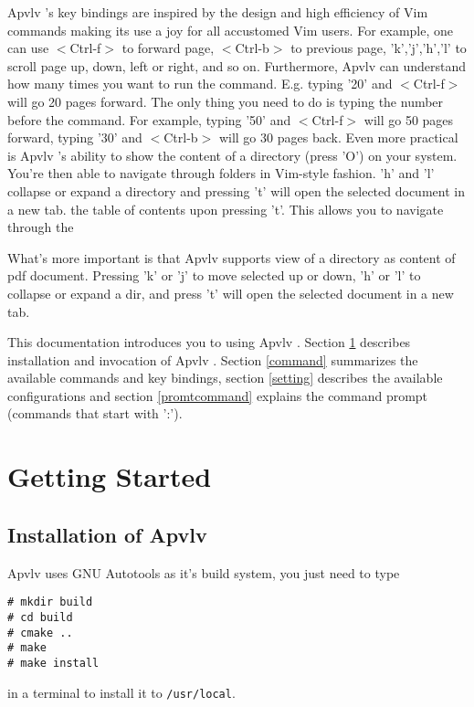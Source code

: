 \documentclass[a4paper,12pt]{article}
\newcommand{\apvlv}{\textsf{Apvlv{ }}}
\begin{document}
\apvlv's key bindings are inspired by the design and high efficiency of Vim commands making its use a joy for all accustomed Vim users. For example, one can use $<$Ctrl-f$>$ to forward page, $<$Ctrl-b$>$ to previous page, 'k','j','h','l' to scroll page up, down, left or right, and so on. 
Furthermore, \apvlv can understand how many times you want to run the command. E.g. typing '20' and  $<$Ctrl-f$>$ will go 20 pages forward.
The only thing you need to do is typing the number before the command. For example, typing '50' and $<$Ctrl-f$>$ will go 50 pages forward, typing '30' and $<$Ctrl-b$>$ will go 30 pages back.
Even more practical is \apvlv's ability to show the content of a directory (press 'O') on your system. You're then able to navigate through folders in Vim-style fashion. 'h' and 'l' collapse or expand a directory and pressing 't' will open the selected document in a new tab.
the table of contents upon pressing 't'. This allows you to navigate through the 

What's more important is that \apvlv supports view of a directory as content of pdf document. Pressing 'k' or 'j' to move selected up or down, 'h' or 'l' to collapse or expand a dir, and press 't' will open the selected document in a new tab.

This documentation introduces you to using \apvlv. Section \ref{gettingstarted} describes installation and invocation of \apvlv. Section \ref{command} summarizes the available commands and key bindings, section \ref{setting} describes the available configurations and section \ref{promtcommand} explains the command prompt (commands that start with ':').


\newpage

\section{Getting Started}\label{gettingstarted}

\subsection{Installation of \apvlv}\label{sinstall}

\apvlv uses GNU Autotools as it's build system, you just need to type
\begin{verbatim}
# mkdir build
# cd build
# cmake ..
# make
# make install
\end{verbatim}
in a terminal to install it to \texttt{/usr/local}.
\end{document}
